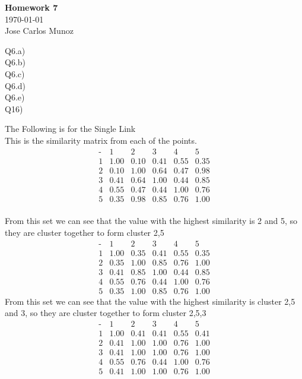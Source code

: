 \documentclass[12pt,english]{article}
\begin{document}
\begin{center}
    \Large
    \textbf{Homework 7}\\
    \small
    \today\\
    \large
    Jose Carlos Munoz
\end{center}%
Q6.a)\\
Q6.b)\\
Q6.c)\\
Q6.d)\\
Q6.e)\\
Q16)\par
The Following is for the Single Link\\
This is the similarity matrix from each of the points.
\begin{equation*}
\begin{array}{c|ccccc}
\mbox{-}& 1 & 2 & 3 & 4 & 5\\
\hline
1 & 1.00 & 0.10 & 0.41 & 0.55 & 0.35 \\
2 & 0.10 & 1.00 & 0.64 & 0.47 & 0.98 \\
3 & 0.41 & 0.64 & 1.00 & 0.44 & 0.85 \\
4 & 0.55 & 0.47 & 0.44 & 1.00 & 0.76 \\
5 & 0.35 & 0.98 & 0.85 & 0.76 & 1.00 
\end{array}
\end{equation*}\\
From this set we can see that the value with the highest similarity is 2 and 5, so they are cluster together to form cluster 2,5\\
\begin{equation*}
\begin{array}{c|ccccc}
\mbox{-}& 1 & 2 & 3 & 4 & 5\\
\hline
1 & 1.00 & 0.35 & 0.41 & 0.55 & 0.35 \\
2 & 0.35 & 1.00 & 0.85 & 0.76 & 1.00 \\
3 & 0.41 & 0.85 & 1.00 & 0.44 & 0.85 \\
4 & 0.55 & 0.76 & 0.44 & 1.00 & 0.76 \\
5 & 0.35 & 1.00 & 0.85 & 0.76 & 1.00 
\end{array}
\end{equation*}
From this set we can see that the value with the highest similarity is cluster 2,5 and 3, so they are cluster together to form cluster 2,5,3\\
\begin{equation*}
\begin{array}{c|ccccc}
\mbox{-}& 1 & 2 & 3 & 4 & 5\\
\hline
1 & 1.00 & 0.41 & 0.41 & 0.55 & 0.41 \\
2 & 0.41 & 1.00 & 1.00 & 0.76 & 1.00 \\
3 & 0.41 & 1.00 & 1.00 & 0.76 & 1.00 \\
4 & 0.55 & 0.76 & 0.44 & 1.00 & 0.76 \\
5 & 0.41 & 1.00 & 1.00 & 0.76 & 1.00 
\end{array}
\end{equation*}
\end{document}
